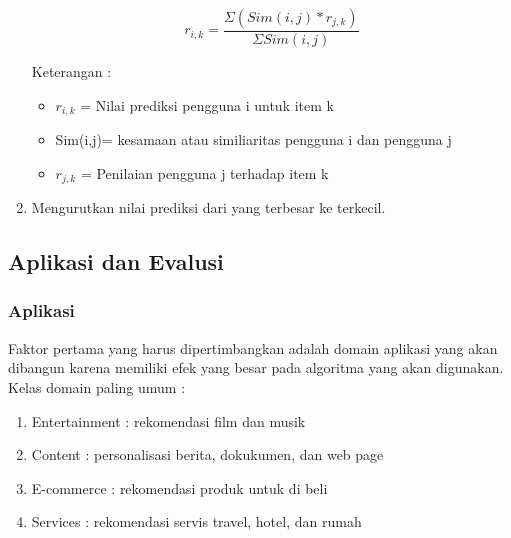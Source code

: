 \begin{enumerate}

	\begin{equation}
		r_{i,k} = \frac{\Sigma (Sim(i,j)*r_{j,k}) }{\Sigma Sim(i,j)}
	\end{equation}		
		
	Keterangan :
	\begin{itemize}
		\item $r_{i,k}$ = Nilai prediksi pengguna i untuk item k
		
		\item Sim(i,j)= kesamaan atau similiaritas pengguna i dan pengguna j
		
		\item $r_{j,k} $ = Penilaian pengguna j terhadap item k
		
		
		
	\end{itemize}\leavevmode
	
	\item Mengurutkan nilai prediksi dari yang terbesar ke terkecil. %
	 
\end{enumerate}\leavevmode

\subsection{Aplikasi dan Evalusi}
\label{sec:aplikasi dan evaluasi}
\subsubsection{Aplikasi}
Faktor pertama yang harus dipertimbangkan adalah domain aplikasi yang akan dibangun karena memiliki efek yang besar pada algoritma yang akan digunakan. Kelas domain paling umum : %
\begin{enumerate}
	\item Entertainment : rekomendasi film dan musik
	\item Content : personalisasi berita, dokukumen, dan web page
	\item E-commerce : rekomendasi produk untuk di beli
	\item Services : rekomendasi servis travel, hotel, dan rumah
\end{enumerate}

